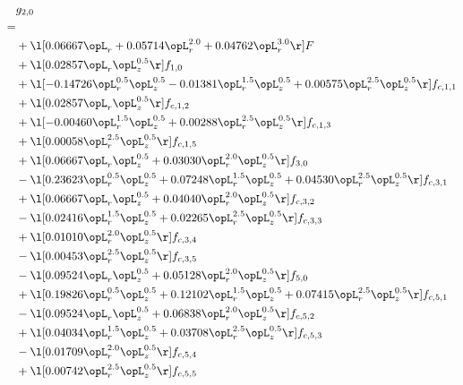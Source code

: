 \begin{alignat}{2} 
\label{eq:g_20_0} 
& g_{2,0} \nonumber \\ 
 = \\ 
& + \l[  0.06667 \opL_r +  0.05714 \opL_r^{2.0} +  0.04762 \opL_r^{3.0}  \r] F \nonumber \\ 
& + \l[  0.02857 \opL_r \opL_z^{0.5}  \r] f_{1,0} \nonumber \\ 
& + \l[  -0.14726 \opL_r^{0.5} \opL_z^{0.5}   -0.01381 \opL_r^{1.5} \opL_z^{0.5} +  0.00575 \opL_r^{2.5} \opL_z^{0.5}  \r] f_{c,1,1} \nonumber \\ 
& + \l[  0.02857 \opL_r \opL_z^{0.5}  \r] f_{c,1,2} \nonumber \\ 
& + \l[  -0.00460 \opL_r^{1.5} \opL_z^{0.5} +  0.00288 \opL_r^{2.5} \opL_z^{0.5}  \r] f_{c,1,3} \nonumber \\ 
& + \l[  0.00058 \opL_r^{2.5} \opL_z^{0.5}  \r] f_{c,1,5} \nonumber \\ 
& + \l[  0.06667 \opL_r \opL_z^{0.5} +  0.03030 \opL_r^{2.0} \opL_z^{0.5}  \r] f_{3,0} \nonumber \\ 
& - \l[  0.23623 \opL_r^{0.5} \opL_z^{0.5} +  0.07248 \opL_r^{1.5} \opL_z^{0.5} +  0.04530 \opL_r^{2.5} \opL_z^{0.5}  \r] f_{c,3,1} \nonumber \\ 
& + \l[  0.06667 \opL_r \opL_z^{0.5} +  0.04040 \opL_r^{2.0} \opL_z^{0.5}  \r] f_{c,3,2} \nonumber \\ 
& - \l[  0.02416 \opL_r^{1.5} \opL_z^{0.5} +  0.02265 \opL_r^{2.5} \opL_z^{0.5}  \r] f_{c,3,3} \nonumber \\ 
& + \l[  0.01010 \opL_r^{2.0} \opL_z^{0.5}  \r] f_{c,3,4} \nonumber \\ 
& - \l[  0.00453 \opL_r^{2.5} \opL_z^{0.5}  \r] f_{c,3,5} \nonumber \\ 
& - \l[  0.09524 \opL_r \opL_z^{0.5} +  0.05128 \opL_r^{2.0} \opL_z^{0.5}  \r] f_{5,0} \nonumber \\ 
& + \l[  0.19826 \opL_r^{0.5} \opL_z^{0.5} +  0.12102 \opL_r^{1.5} \opL_z^{0.5} +  0.07415 \opL_r^{2.5} \opL_z^{0.5}  \r] f_{c,5,1} \nonumber \\ 
& - \l[  0.09524 \opL_r \opL_z^{0.5} +  0.06838 \opL_r^{2.0} \opL_z^{0.5}  \r] f_{c,5,2} \nonumber \\ 
& + \l[  0.04034 \opL_r^{1.5} \opL_z^{0.5} +  0.03708 \opL_r^{2.5} \opL_z^{0.5}  \r] f_{c,5,3} \nonumber \\ 
& - \l[  0.01709 \opL_r^{2.0} \opL_z^{0.5}  \r] f_{c,5,4} \nonumber \\ 
& + \l[  0.00742 \opL_r^{2.5} \opL_z^{0.5}  \r] f_{c,5,5} \nonumber \\ 
\end{alignat} 


